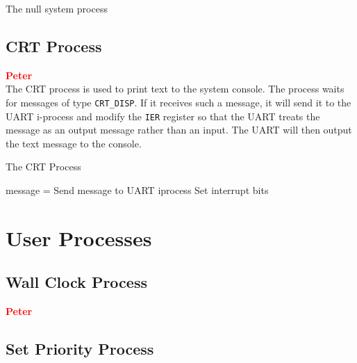 \documentclass[12pt]{report}
\begin{document}
\begin{algorithm}
  \caption{The null system process}
  \begin{algorithmic}[1]
			\State {}
		\EndWhile
    \EndProcedure
  \end{algorithmic}
\end{algorithm}

\subsection{CRT Process}

\textcolor{red}{\textbf{Peter}} \\

The CRT process is used to print text to the system console. The process waits for messages of type {\tt CRT\_DISP}. If it receives such a message, it will send it to the UART i-process and modify the {\tt IER} register so that the UART treats the message as an output message rather than an input. The UART will then output the text message to the console.\\

\begin{algorithm}
  \caption{The CRT Process}
  \begin{algorithmic}[1]
			\State message = 
				\State Send message to UART iprocess
				\State Set interrupt bits
			\Else
				\State {}
			\EndIf
		\EndWhile
    \EndProcedure
  \end{algorithmic}
\end{algorithm}


\section{User Processes}

\subsection{Wall Clock Process}

\textcolor{red}{\textbf{Peter}} \\

\subsection{Set Priority Process}
\end{document}
